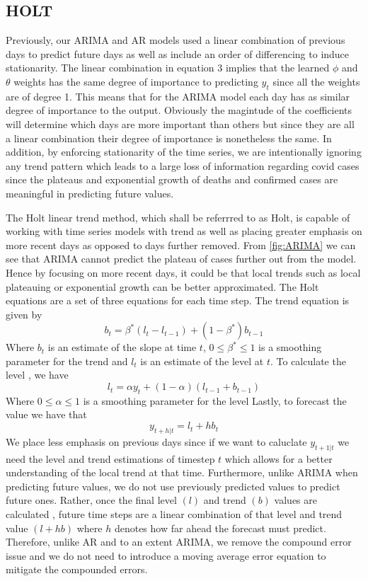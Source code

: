 \documentclass[sigconf,nonacm]{acmart}
\begin{document}
\subsection{HOLT}
Previously, our ARIMA and AR models used a linear combination of previous days to predict future days as well as include an 
order of differencing to induce stationarity. The linear combination in equation 3 implies that the learned $\phi$ and $\theta$
weights has the same degree of importance to predicting $y_t$ since all the weights are of degree 1. This means that for 
the ARIMA model each day has as similar degree of importance to the output. Obviously the magintude of the coefficients will
determine which days are more important than others but since they are all a linear combination their degree of importance is
nonetheless the same. In addition, by enforcing stationarity of the time series, we are intentionally ignoring any trend pattern
which leads to a large loss of information regarding covid cases since the plateaus and exponential growth of deaths and 
confirmed cases are meaningful in predicting future values.

The Holt linear trend method, which shall be referrred to as Holt, is capable of working with time series models with trend
as well as placing greater emphasis on more recent days as opposed to days further removed. From \ref{fig:ARIMA} we can see
that ARIMA cannot predict the plateau of cases further out from the model. Hence by focusing on more recent days,
it could be that local trends such as local plateauing or exponential growth can be better approximated. The Holt equations
are a set of three equations for each time step. The trend equation \cite{forecasting} is given by
\begin{equation}
  b_t = \beta^*(l_t - l_{t-1}) + (1-\beta^*)b_{t-1}
\end{equation}
Where $b_t$ is an estimate of the slope at time $t$, $0 \leq \beta^* \leq 1$ is a smoothing parameter for the trend and 
$l_t$ is an estimate of the level at $t$. To calculate the level \cite{forecasting}, we have
\begin{equation}
  l_t = \alpha y_t + (1 - \alpha)(l_{t-1} + b_{t-1})
\end{equation}
Where $0 \leq \alpha \leq 1$ is a smoothing parameter for the level 
Lastly, to forecast the value \cite{forecasting} we have that
\begin{equation}
  y_{t+h|t} = l_t + hb_t
\end{equation}
We place less emphasis on previous days since if we want to caluclate $y_{t+1|t}$ we need the level and trend estimations of
timestep $t$ which allows for a better understanding of the local trend at that time. Furthermore, unlike ARIMA when predicting
future values, we do not use previously predicted values to predict future ones. Rather, once the final level $(l)$ and trend $(b)$ values
are calculated , future time steps are a linear combination of that level and trend value $(l + hb)$ where $h$ denotes how far ahead
the forecast must predict. Therefore, unlike AR and to an extent ARIMA, we remove the compound error issue and we do not need to introduce
a moving average error equation to mitigate the compounded errors. 
\end{document}
